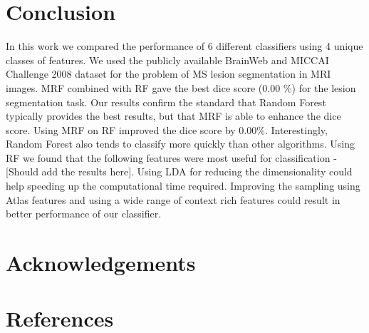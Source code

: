 \documentclass{article} %
\begin{document}
\section{Conclusion}
In this work we compared the performance of 6 different classifiers using 4 unique classes of features. We used the publicly available BrainWeb and MICCAI Challenge 2008 dataset for the problem of MS lesion segmentation in MRI images. MRF combined with RF gave the best dice score (0.00 \%) for the lesion segmentation task. Our results confirm the standard \cite{garcia2013review} that Random Forest typically provides the best results, but that MRF is able to enhance the dice score. Using MRF on RF improved the dice score by 0.00\%. Interestingly, Random Forest also tends to classify more quickly than other algorithms. Using RF we found that the following features were most useful for classification - [Should add the results here]. Using LDA for reducing the dimensionality could help speeding up the computational time required. Improving the sampling using Atlas features and using a wide range of context rich features could result in better performance of our classifier.


\section{Acknowledgements}


\section{References}



\end{document}
